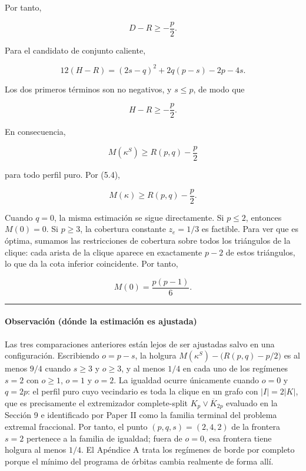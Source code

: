 \documentclass[
  spanish,
  11pt,
  a4paper,
]{article}
\begin{document}
Por tanto,

\[
D-R\ge-\frac p2.
\tag{7.5}
\]

Para el candidato de conjunto caliente,

\[
12(H-R)
=
(2s-q)^2+2q(p-s)-2p-4s.
\tag{7.6}
\]

Los dos primeros términos son no negativos, y \(s\le p\), de modo que

\[
H-R\ge-\frac p2.
\tag{7.7}
\]

En consecuencia,

\[
M(\kappa^S)
\ge
R(p,q)-\frac p2
\]

para todo perfil puro. Por (5.4),

\[
\boxed{
M(\kappa)
\ge
R(p,q)-\frac p2.
}
\tag{7.8}
\]

Cuando \(q=0\), la misma estimación se sigue directamente. Si \(p\le2\), entonces \(M(0)=0\). Si \(p\ge3\), la cobertura constante \(z_e=1/3\) es factible. Para ver que es óptima, sumamos las restricciones de cobertura sobre todos los triángulos de la clique: cada arista de la clique aparece en exactamente \(p-2\) de estos triángulos, lo que da la cota inferior coincidente. Por tanto,

\[
M(0)=\frac{p(p-1)}6.
\]

\begin{center}\rule{0.5\linewidth}{0.5pt}\end{center}

\paragraph{Observación (dónde la estimación es ajustada)}\label{observaciuxf3n-duxf3nde-la-estimaciuxf3n-es-ajustada}

Las tres comparaciones anteriores están lejos de ser ajustadas salvo en una configuración. Escribiendo \(o=p-s\), la holgura \(M(\kappa^S)-\big(R(p,q)-p/2\big)\) es al menos \(9/4\) cuando \(s\ge3\) y \(o\ge3\), y al menos \(1/4\) en cada uno de los regímenes \(s=2\) con \(o\ge1\), \(o=1\) y \(o=2\). La igualdad ocurre únicamente cuando \(o=0\) y \(q=2p\): el perfil puro cuyo vecindario es toda la clique en un grafo con \(|I|=2|K|\), que es precisamente el extremizador complete-split \(K_p\vee\overline K_{2p}\) evaluado en la Sección 9 e identificado por Paper II como la familia terminal del problema extremal fraccional. Por tanto, el punto \((p,q,s)=(2,4,2)\) de la frontera \(s=2\) pertenece a la familia de igualdad; fuera de \(o=0\), esa frontera tiene holgura al menos \(1/4\). El Apéndice A trata los regímenes de borde por completo porque el mínimo del programa de órbitas cambia realmente de forma allí.
\end{document}
